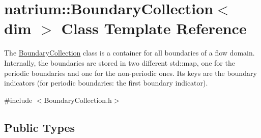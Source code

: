 \hypertarget{classnatrium_1_1BoundaryCollection}{
\section{natrium::BoundaryCollection$<$ dim $>$ Class Template Reference}
\label{classnatrium_1_1BoundaryCollection}
}


The \hyperlink{classnatrium_1_1BoundaryCollection}{BoundaryCollection} class is a container for all boundaries of a flow domain. Internally, the boundaries are stored in two different std::map, one for the periodic boundaries and one for the non-\/periodic ones. Its keys are the boundary indicators (for periodic boundaries: the first boundary indicator).  


{\ttfamily \#include $<$BoundaryCollection.h$>$}\subsection*{Public Types}
